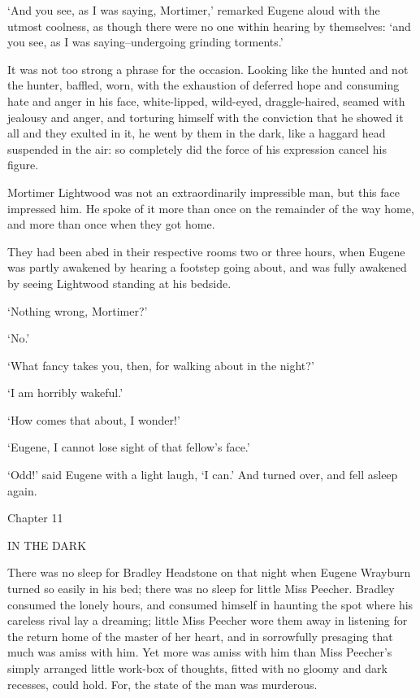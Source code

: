 ‘And you see, as I was saying, Mortimer,’ remarked Eugene aloud with
the utmost coolness, as though there were no one within hearing
by themselves: ‘and you see, as I was saying--undergoing grinding
torments.’

It was not too strong a phrase for the occasion. Looking like the hunted
and not the hunter, baffled, worn, with the exhaustion of deferred
hope and consuming hate and anger in his face, white-lipped, wild-eyed,
draggle-haired, seamed with jealousy and anger, and torturing himself
with the conviction that he showed it all and they exulted in it, he
went by them in the dark, like a haggard head suspended in the air: so
completely did the force of his expression cancel his figure.

Mortimer Lightwood was not an extraordinarily impressible man, but this
face impressed him. He spoke of it more than once on the remainder of
the way home, and more than once when they got home.

They had been abed in their respective rooms two or three hours, when
Eugene was partly awakened by hearing a footstep going about, and was
fully awakened by seeing Lightwood standing at his bedside.

‘Nothing wrong, Mortimer?’

‘No.’

‘What fancy takes you, then, for walking about in the night?’

‘I am horribly wakeful.’

‘How comes that about, I wonder!’

‘Eugene, I cannot lose sight of that fellow’s face.’

‘Odd!’ said Eugene with a light laugh, ‘I can.’ And turned over, and
fell asleep again.



Chapter 11

IN THE DARK


There was no sleep for Bradley Headstone on that night when Eugene
Wrayburn turned so easily in his bed; there was no sleep for little
Miss Peecher. Bradley consumed the lonely hours, and consumed himself in
haunting the spot where his careless rival lay a dreaming; little Miss
Peecher wore them away in listening for the return home of the master
of her heart, and in sorrowfully presaging that much was amiss with him.
Yet more was amiss with him than Miss Peecher’s simply arranged little
work-box of thoughts, fitted with no gloomy and dark recesses, could
hold. For, the state of the man was murderous.

